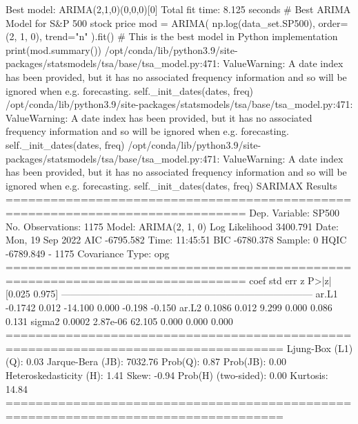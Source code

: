Best model:  ARIMA(2,1,0)(0,0,0)[0]          
Total fit time: 8.125 seconds
# Best ARIMA Model for S&P 500 stock price
mod = ARIMA(
    np.log(data_set.SP500), order=(2, 1, 0), trend="n"
).fit()  # This is the best model in Python implementation
print(mod.summary())
/opt/conda/lib/python3.9/site-packages/statsmodels/tsa/base/tsa_model.py:471: ValueWarning: A date index has been provided, but it has no associated frequency information and so will be ignored when e.g. forecasting.
  self._init_dates(dates, freq)
/opt/conda/lib/python3.9/site-packages/statsmodels/tsa/base/tsa_model.py:471: ValueWarning: A date index has been provided, but it has no associated frequency information and so will be ignored when e.g. forecasting.
  self._init_dates(dates, freq)
/opt/conda/lib/python3.9/site-packages/statsmodels/tsa/base/tsa_model.py:471: ValueWarning: A date index has been provided, but it has no associated frequency information and so will be ignored when e.g. forecasting.
  self._init_dates(dates, freq)
                               SARIMAX Results                                
==============================================================================
Dep. Variable:                  SP500   No. Observations:                 1175
Model:                 ARIMA(2, 1, 0)   Log Likelihood                3400.791
Date:                Mon, 19 Sep 2022   AIC                          -6795.582
Time:                        11:45:51   BIC                          -6780.378
Sample:                             0   HQIC                         -6789.849
                               - 1175                                         
Covariance Type:                  opg                                         
==============================================================================
                 coef    std err          z      P>|z|      [0.025      0.975]
------------------------------------------------------------------------------
ar.L1         -0.1742      0.012    -14.100      0.000      -0.198      -0.150
ar.L2          0.1086      0.012      9.299      0.000       0.086       0.131
sigma2         0.0002   2.87e-06     62.105      0.000       0.000       0.000
===================================================================================
Ljung-Box (L1) (Q):                   0.03   Jarque-Bera (JB):              7032.76
Prob(Q):                              0.87   Prob(JB):                         0.00
Heteroskedasticity (H):               1.41   Skew:                            -0.94
Prob(H) (two-sided):                  0.00   Kurtosis:                        14.84
===================================================================================

